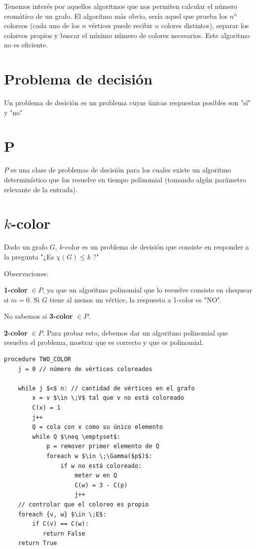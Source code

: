 \documentclass[10pt,a4paper]{article}
\begin{document}
Tenemos interés por aquellos algoritmos que nos permiten calcular el número cromático de un grafo. El algoritmo más obvio, sería aquel que prueba los $n^n$ coloreos (cada uno de los $n$ vértices puede recibir $n$ colores distintos), separar los coloreos propios y buscar el mínimo número de colores necesarios. Este algoritmo no es eficiente.

\section*{Problema de decisión}

Un problema de desición es un problema cuyas únicas respuestas posibles son "sí" y "no"

\section*{P}

$P$ es una clase de problemas de decisión para los cuales existe un algoritmo determinístico que los resuelve en tiempo polinomial (tomando algún parámetro relevante de la entrada).

\section*{$k$-color}

Dado un grafo $G$, $k$-color es un problema de decisión que consiste en responder a la pregunta "¿Es $\chi(G) \leq k$ ?"

Observaciones:

\textbf{1-color} $\in P$, ya que un algoritmo polinomial que lo resuelve consiste en chequear si $m=0$. Si $G$ tiene al menos un vértice, la respuesta a 1-color es "NO".

No sabemos si \textbf{3-color} $\in P$.

\textbf{2-color} $\in P$. Para probar esto, debemos dar un algoritmo polinomial que resuelva el problema, mostrar que es correcto y que es polinomial.


    \begin{lstlisting}[language=pseudo]
procedure TWO_COLOR
    j = 0 // número de vértices coloreados

    while j $<$ n: // cantidad de vértices en el grafo
        x = v $\in \;V$ tal que v no está coloreado
        C(x) = 1
        j++
        Q = cola con x como su único elemento
        while Q $\neq \emptyset$:
            p = remover primer elemento de Q
            foreach w $\in \;\Gamma($p$)$:
                if w no está coloreado:
                    meter w en Q
                    C(w) = 3 - C(p)
                    j++
    // controlar que el coloreo es propio
    foreach {v, w} $\in \;E$:
        if C(v) == C(w):
           return False
    return True
\end{lstlisting}
\end{document}
